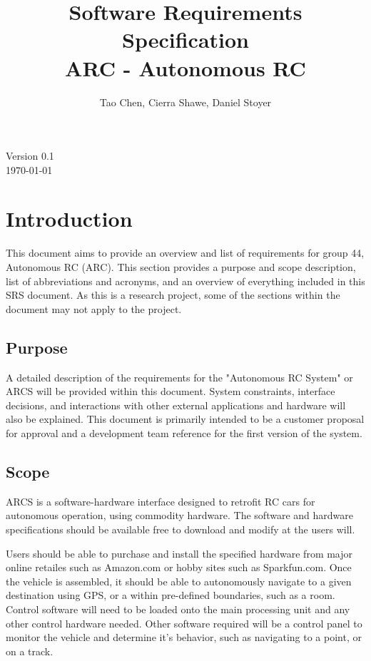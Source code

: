 \documentclass[compsoc,draftclsnofoot,onecolumn,10pt]{IEEEtran}
\date{}
\begin{document}
\begin{titlepage}
	\title{Software Requirements Specification\\
	ARC - Autonomous RC}
	\author{Tao Chen, Cierra Shawe, Daniel Stoyer}
	\maketitle
	\begin{center}
	Version 0.1\\
	\vspace{1.9cm}
	\today
	\end{center}

	\thispagestyle{empty} %
	
\end{titlepage}

\tableofcontents

\newpage

\section{Introduction} %
This document aims to provide an overview and list of requirements for group 44, Autonomous RC (ARC). 
This section provides a purpose and scope description, list of abbreviations and acronyms, and an overview of everything included in this SRS document. 
As this is a research project, some of the sections within the document may not apply to the project. 


\subsection{Purpose} %
A detailed description of the requirements for the "Autonomous RC System" or ARCS will be provided within this document. 
System constraints, interface decisions, and interactions with other external applications and hardware will also be explained. 
This document is primarily intended to be a customer proposal for approval and a development team reference for the first version of the system.

\subsection{Scope} %
ARCS is a software-hardware interface designed to retrofit RC cars for autonomous operation, using commodity hardware. 
The software and hardware specifications should be available free to download and modify at the users will. \par
Users should be able to purchase and install the specified hardware from major online retailes such as Amazon.com or hobby sites such as Sparkfun.com.
Once the vehicle is assembled, it should be able to autonomously navigate to a given destination using GPS, or a within pre-defined boundaries, such as a room.  
Control software will need to be loaded onto the main processing unit and any other control hardware needed. 
Other software required will be a control panel to monitor the vehicle and determine it's behavior, such as navigating to a point, or on a track. 
\end{document}

